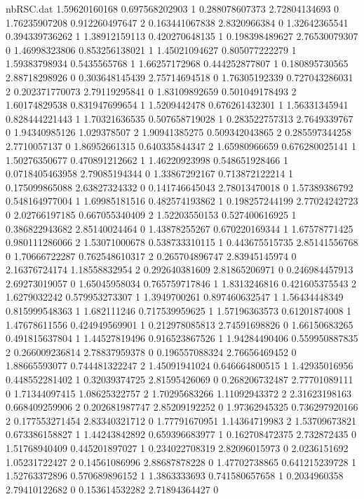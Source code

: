 \begin{filecontents}{nbRSC.dat}
1.59620160168 0.697568202903 1
0.288078607373 2.72804134693 0
1.76235907208 0.912260497647 2
0.163441067838 2.8320966384 0
1.32642365541 0.394339736262 1
1.38912159113 0.420270648135 1
0.198398489627 2.76530079307 0
1.46998323806 0.853256138021 1
1.45021094627 0.805077222279 1
1.59383798934 0.5435565768 1
1.66257172968 0.444252877807 1
0.180895730565 2.88718298926 0
0.303648145439 2.75714694518 0
1.76305192339 0.727043286031 2
0.202371770073 2.79119295841 0
1.83109892659 0.501049178493 2
1.60174829538 0.831947699654 1
1.5209442478 0.676261432301 1
1.56331345941 0.828444221443 1
1.70321636535 0.507658719028 1
0.283522757313 2.7649339767 0
1.94340985126 1.029378507 2
1.90941385275 0.509342043865 2
0.285597344258 2.7710057137 0
1.86952661315 0.640335844347 2
1.65980966659 0.676280025141 1
1.50276350677 0.470891212662 1
1.46220923998 0.548651928466 1
0.0718405463958 2.79085194344 0
1.33867292167 0.713872122214 1
0.175099865088 2.63827324332 0
0.141746645043 2.78013470018 0
1.57389386792 0.548164977004 1
1.69985181516 0.482574193862 1
0.198257244199 2.77024242723 0
2.02766197185 0.667055340409 2
1.52203550153 0.527400616925 1
0.386822943682 2.85140024464 0
1.43878255267 0.670220169344 1
1.67578771425 0.980111286066 2
1.53071000678 0.538733310115 1
0.443675515735 2.85141556768 0
1.70666722287 0.762548610317 2
0.265704896747 2.83945145974 0
2.16376724174 1.18558832954 2
0.292640381609 2.81865206971 0
0.246984457913 2.69273019057 0
1.65045958034 0.765759717846 1
1.8313246816 0.421605375543 2
1.6279032242 0.579953273307 1
1.3949700261 0.897460632547 1
1.56434448349 0.815999548363 1
1.682111246 0.717539959625 1
1.57196363573 0.61201874008 1
1.47678611556 0.424949569901 1
0.212978085813 2.74591698826 0
1.66150683265 0.491815637804 1
1.44527819496 0.916523867526 1
1.94284490406 0.559950887835 2
0.266009236814 2.78837959378 0
0.196557088324 2.76656469452 0
1.88665593077 0.744481322247 2
1.45091941024 0.646664800515 1
1.42935016956 0.448552281402 1
0.32039374725 2.81595426069 0
0.268206732487 2.77701089111 0
1.71344097415 1.08625322757 2
1.70295683266 1.11092943372 2
2.31623198163 0.668409259906 2
0.202681987747 2.85209192252 0
1.97362945325 0.736297920166 2
0.177553271454 2.83340321712 0
1.77791670951 1.14364719983 2
1.53709673821 0.673386158827 1
1.44243842892 0.659396683977 1
0.162708472375 2.732872435 0
1.51768940409 0.445201897027 1
0.234022708319 2.82096015973 0
2.0236151692 1.05231722427 2
0.14561086996 2.88687878228 0
1.47702738865 0.641215239728 1
1.52763372896 0.570689896152 1
1.3863333693 0.741580657658 1
0.2034960358 2.79410122682 0
0.153614532282 2.71894364427 0

\end{filecontents}
